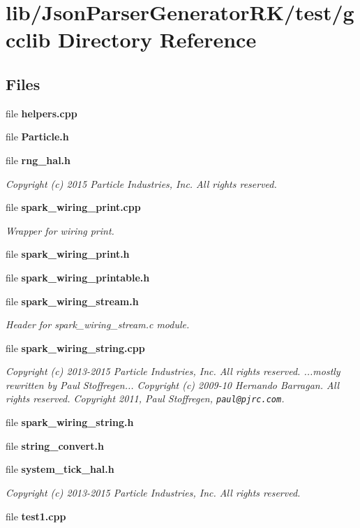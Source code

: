 \section{lib/\+Json\+Parser\+Generator\+R\+K/test/gcclib Directory Reference}
\label{dir_acd83592639e3b1a431ffea1dc6b2f12}
\subsection*{Files}
\begin{DoxyCompactItemize}
\item 
file \textbf{ helpers.\+cpp}
\item 
file \textbf{ Particle.\+h}
\item 
file \textbf{ rng\+\_\+hal.\+h}
\begin{DoxyCompactList}\small\item\em Copyright (c) 2015 Particle Industries, Inc. All rights reserved. \end{DoxyCompactList}\item 
file \textbf{ spark\+\_\+wiring\+\_\+print.\+cpp}
\begin{DoxyCompactList}\small\item\em Wrapper for wiring print. \end{DoxyCompactList}\item 
file \textbf{ spark\+\_\+wiring\+\_\+print.\+h}
\item 
file \textbf{ spark\+\_\+wiring\+\_\+printable.\+h}
\item 
file \textbf{ spark\+\_\+wiring\+\_\+stream.\+h}
\begin{DoxyCompactList}\small\item\em Header for spark\+\_\+wiring\+\_\+stream.\+c module. \end{DoxyCompactList}\item 
file \textbf{ spark\+\_\+wiring\+\_\+string.\+cpp}
\begin{DoxyCompactList}\small\item\em Copyright (c) 2013-\/2015 Particle Industries, Inc. All rights reserved. ...mostly rewritten by Paul Stoffregen... Copyright (c) 2009-\/10 Hernando Barragan. All rights reserved. Copyright 2011, Paul Stoffregen, {\tt paul@pjrc.\+com}. \end{DoxyCompactList}\item 
file \textbf{ spark\+\_\+wiring\+\_\+string.\+h}
\item 
file \textbf{ string\+\_\+convert.\+h}
\item 
file \textbf{ system\+\_\+tick\+\_\+hal.\+h}
\begin{DoxyCompactList}\small\item\em Copyright (c) 2013-\/2015 Particle Industries, Inc. All rights reserved. \end{DoxyCompactList}\item 
file \textbf{ test1.\+cpp}
\end{DoxyCompactItemize}
